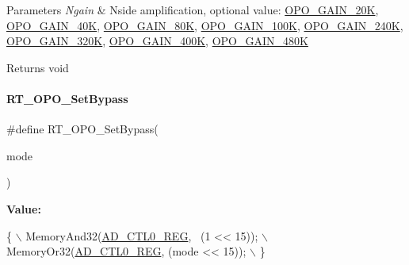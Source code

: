 \begin{DoxyParams}{Parameters}
{\em Ngain} & Nside amplification, optional value\+: \mbox{\hyperlink{a00002_a6424f6db97a2e691b73af9c4053f1650a44bf632448f2bed40aad8456d4ab211e}{O\+P\+O\+\_\+\+G\+A\+I\+N\+\_\+20K}}, \mbox{\hyperlink{a00002_a6424f6db97a2e691b73af9c4053f1650adbde1c86d4a091e298c72418f7ccf5eb}{O\+P\+O\+\_\+\+G\+A\+I\+N\+\_\+40K}}, \mbox{\hyperlink{a00002_a6424f6db97a2e691b73af9c4053f1650a42eb5c59d1b93acc89ceb144bbe3fca0}{O\+P\+O\+\_\+\+G\+A\+I\+N\+\_\+80K}}, \mbox{\hyperlink{a00002_a6424f6db97a2e691b73af9c4053f1650a1f2a22a037ee965a0b37a2f5c3eed0bc}{O\+P\+O\+\_\+\+G\+A\+I\+N\+\_\+100K}}, \mbox{\hyperlink{a00002_a6424f6db97a2e691b73af9c4053f1650ad9ddaa398b63e426eb6f7d6c721aa2af}{O\+P\+O\+\_\+\+G\+A\+I\+N\+\_\+240K}}, \mbox{\hyperlink{a00002_a6424f6db97a2e691b73af9c4053f1650afd00b530e99b17ea02716d355ecdd695}{O\+P\+O\+\_\+\+G\+A\+I\+N\+\_\+320K}}, \mbox{\hyperlink{a00002_a6424f6db97a2e691b73af9c4053f1650ab647d5f1f3b13168dca7f204c08021a8}{O\+P\+O\+\_\+\+G\+A\+I\+N\+\_\+400K}}, \mbox{\hyperlink{a00002_a6424f6db97a2e691b73af9c4053f1650a2b7df29c5ca03fcca36f648dbd2dc95b}{O\+P\+O\+\_\+\+G\+A\+I\+N\+\_\+480K}} \\
\hline
\end{DoxyParams}
\begin{DoxyReturn}{Returns}
void 
\end{DoxyReturn}
\mbox{\label{a00002_a3297280ab870eae12b918351e111819a}} 
\paragraph{\texorpdfstring{R\+T\+\_\+\+O\+P\+O\+\_\+\+Set\+Bypass}{RT\_OPO\_SetBypass}}
{\footnotesize\ttfamily \#define R\+T\+\_\+\+O\+P\+O\+\_\+\+Set\+Bypass(\begin{DoxyParamCaption}\item[{}]{mode }\end{DoxyParamCaption})}

{\bfseries Value\+:}
\begin{DoxyCode}
\{                                           \(\backslash\)
        MemoryAnd32(\mbox{\hyperlink{a00020_adadaa0ab1ebbd7ba9b70dfd24c3ed44da479497b755dee411ad6348cae2ef26b4}{AD\_CTL0\_REG}}, ~(1 << 15));   \(\backslash\)
        MemoryOr32(\mbox{\hyperlink{a00020_adadaa0ab1ebbd7ba9b70dfd24c3ed44da479497b755dee411ad6348cae2ef26b4}{AD\_CTL0\_REG}}, (mode << 15));  \(\backslash\)
    \}
\end{DoxyCode}


